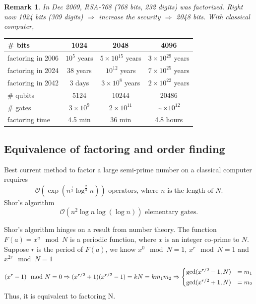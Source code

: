 \documentclass[]{book}
\newtheorem*{remark}{Remark}
\theoremstyle{nonumberplain}
\begin{document}
\begin{remark}
    In Dec 2009, RSA-768 (768 bits, 232 digits) was factorized. Right now 1024 bits (309 digits) $\Rightarrow$ increase the security $\Rightarrow$ 2048 bits. With classical computer,  
\end{remark}
\begin{table}[h]
    \centering
    \begin{tabular}{l|c|c|c}
         \# bits & 1024 & 2048 & 4096 \\ \hline
         factoring in 2006 & $10^{5}$ years & $5 \times 10^{15}$ years& $3 \times 10^{29}$ years \\
         factoring in 2024 & 38 years & $10^{12}$ years& $7 \times 10^{25}$ years \\
         factoring in 2042 & 3 days & $3 \times 10^{8}$ years& $2 \times 10^{22}$ years \\\hline
    
        \# qubits & 5124 & 10244 & 20486 \\ \hline
        \# gates & $3\times 10^9$ & $2 \times 10^{11}$ & $\sim \times 10^{12}$ \\ 
        factoring time & 4.5 min & 36 min & 4.8 hours \\
    \end{tabular}
\end{table}

\subsection{Equivalence of factoring and order finding}
Best current method to factor a large semi-prime number on a classical computer requires  
\[
	\mathcal{O}\left(\exp{(n^{\frac{1}{3}}\log^{\frac{2}{3}}{n})}\right) \text{ operators, where $n$ is the length of $N$.}
\] 
Shor's algorithm
\[
	\mathcal{O}(n^{2}\log{n}\log{(\log{n})}) \text{ elementary gates.}
\] 

Shor's algorithm hinges on a result from number theory. The function $F(a)=x^{a} \mod{N}$ is a periodic function, where $x$ is an integer co-prime to $N$.\\
Suppose $r$ is the period of $F(a)$, we know $x^{0}\mod{N}=1$, $x^{r} \mod{N} = 1$ and $x^{2r}\mod{N}=1$
\[
	(x^{r}-1)\mod{N} = 0 \Rightarrow (x^{r/2}+1)(x^{r/2}-1) = kN = km_{1}m_{2}\Rightarrow 
\begin{aligned}
\begin{dcases}
	\text{gcd}(x^{r/2}-1,N) &= m_{1} \\
	\text{gcd}(x^{r/2}+1,N) &= m_{2} \\
\end{dcases}
\end{aligned}
\] 
Thus, it is equivalent to factoring N.
\end{document}
